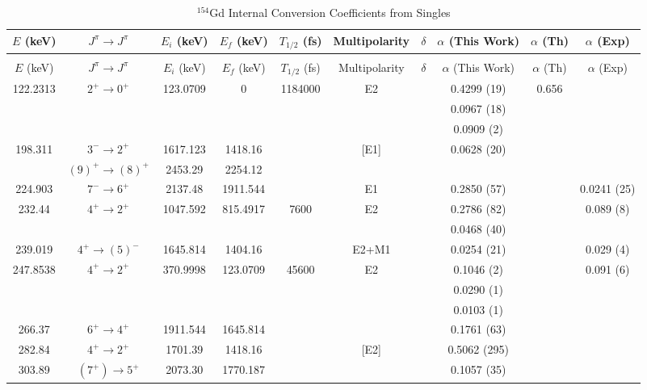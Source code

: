 \begin{landscape}
    \begin{longtable}{c|c|c|c|c|c|c|c|c|c}
    \caption{$^{154}$Gd Internal Conversion Coefficients from Singles}
        \label{tab:154Gd_Corr_ICC}\\
        $E$ (keV)	&	$J^{\pi}	\rightarrow	J^{\pi}$	&	$E_i$ (keV)	&	$E_f$ (keV)	&	$T_{1/2}$ (fs)	&	Multipolarity	&	$\delta$	&	$\alpha$ (This Work)				&	$\alpha$  (Th)	&	$\alpha$ (Exp)	\\
\hline
        \endfirsthead
    \caption[]{$^{154}$Gd Internal Conversion Coefficients from Singles}\\
$E$ (keV)	&	$J^{\pi}	\rightarrow	J^{\pi}$	&	$E_i$ (keV)	&	$E_f$ (keV)	&	$T_{1/2}$ (fs)	&	Multipolarity	&	$\delta$	&	$\alpha$ (This Work)				&	$\alpha$  (Th)	&	$\alpha$ (Exp)	\\
\hline
	\endhead
	\hline
122.2313	&	$2^+	\rightarrow	0^+$	&	123.0709	&	0	&	1184000	&	E2	&		&	0.4299	(19)	&	0.656	&		\\
	&				&		&		&		&		&		&	0.0967	(18)	&		&		\\
	&				&		&		&		&		&		&	0.0909	(2)	&		&		\\
198.311	&	$3^-	\rightarrow	2^+$	&	1617.123	&	1418.16	&		&	[E1]	&		&	0.0628	(20)	&		&		\\
	&	$(9)^+	\rightarrow	(8)^+$	&	2453.29	&	2254.12	&		&		&		&					&		&		\\
224.903	&	$7^-	\rightarrow	6^+$	&	2137.48	&	1911.544	&		&	E1	&		&	0.2850	(57)	&		&	0.0241 (25)	\\
232.44	&	$4^+	\rightarrow	2^+$	&	1047.592	&	815.4917	&	7600	&	E2	&		&	0.2786	(82)	&		&	0.089 (8)	\\
	&				&		&		&		&		&		&	0.0468	(40)	&		&		\\
239.019	&	$4^+	\rightarrow	(5)^-$	&	1645.814	&	1404.16	&		&	E2+M1	&		&	0.0254	(21)	&		&	0.029 (4)	\\
247.8538	&	$4^+	\rightarrow	2^+$	&	370.9998	&	123.0709	&	45600	&	E2	&		&	0.1046	(2)	&		&	0.091 (6)	\\
	&				&		&		&		&		&		&	0.0290	(1)	&		&		\\
	&				&		&		&		&		&		&	0.0103	(1)	&		&		\\
266.37	&	$6^+	\rightarrow	4^+$	&	1911.544	&	1645.814	&		&		&		&	0.1761	(63)	&		&		\\
282.84	&	$4^+	\rightarrow	2^+$	&	1701.39	&	1418.16	&		&	[E2]	&		&	0.5062	(295)	&		&		\\
303.89	&	$(7^+)	\rightarrow	5^+$	&	2073.30	&	1770.187	&		&		&		&	0.1057	(35)	&		&		\\

\end{longtable}
\end{landscape}
